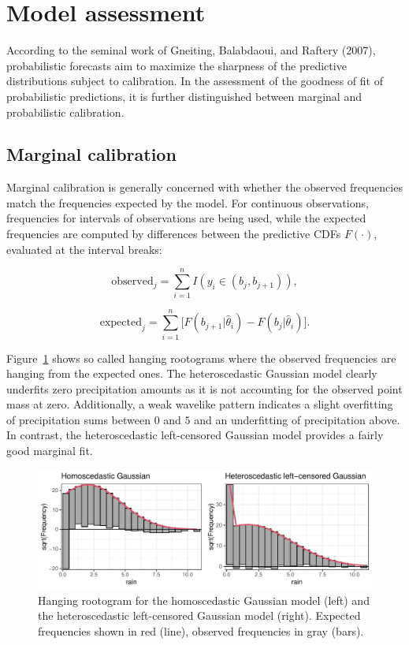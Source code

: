 \documentclass[twoside]{report}
\begin{document}
\section{Model assessment}

According to the seminal work of Gneiting, Balabdaoui, and Raftery (2007),
probabilistic forecasts aim to maximize the sharpness of the predictive
distributions subject to calibration. 
In the assessment of the goodness of fit of probabilistic predictions,
it is further distinguished between marginal and probabilistic calibration.

\subsection{Marginal calibration}


Marginal calibration is generally concerned with whether the observed
frequencies match the frequencies expected by the model.  For continuous
observations, frequencies for intervals of observations are being used, while
the expected frequencies are computed by differences between the predictive
CDFs $F(\cdot)$, evaluated at the interval breaks:


$$
\text{observed}_j = \sum_{i=1}^n I(y_i \in (b_j, b_{j+1})),
$$

$$
\text{expected}_j = \sum_{i=1}^n \big[ F(b_{j+1} | \hat{\theta}_i) - F(b_{j} | \hat{\theta}_i) \big].
$$

Figure~\ref{stauffer:fig1} shows so called hanging rootograms where the
observed frequencies are hanging from the expected ones. The heteroscedastic
Gaussian model clearly underfits zero precipitation amounts as it is not
accounting for the observed point mass at zero.  Additionally, a weak wavelike
pattern indicates a slight overfitting of precipitation sums between $0$ and
$5$ and an underfitting of precipitation above. In contrast, the
heteroscedastic left-censored Gaussian model provides a fairly good marginal fit.

\begin{figure}[!ht]\centering
    \includegraphics[width=\textwidth]{Stauffer-rootograms}
    \caption{\label{stauffer:fig1}
        Hanging rootogram for the homoscedastic Gaussian model (left)
        and the heteroscedastic left-censored Gaussian model (right).
        Expected frequencies shown in red (line), observed frequencies
        in gray (bars).
    }
\end{figure}
\end{document}

